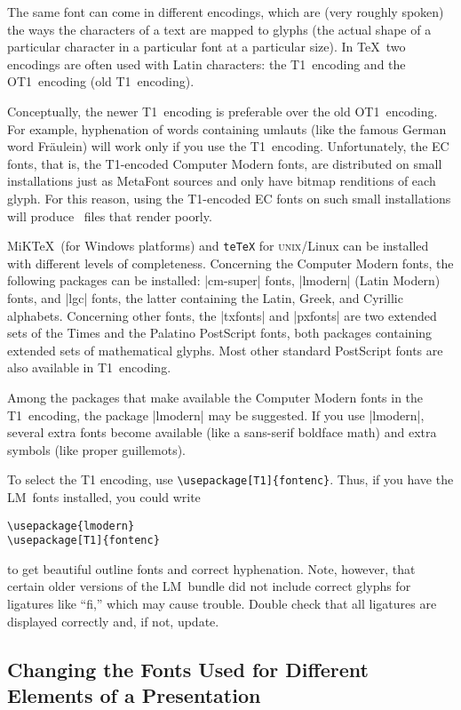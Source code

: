 The same font can come in different encodings, which are (very roughly
spoken) the ways the characters of a text are mapped to glyphs (the
actual shape of a particular character in a particular font at a
particular size). In \TeX\ two encodings are often used with Latin
characters: the T1~encoding and the OT1~encoding (old T1~encoding).

Conceptually, the newer T1~encoding is preferable over the old
OT1~encoding. For example, hyphenation of words containing umlauts
(like the famous German word Fr\"aulein) will work only if you use the
T1~encoding. Unfortunately, the EC fonts, that is, the T1-encoded
Computer Modern fonts, are distributed on small installations just as
MetaFont sources and only have bitmap renditions of each glyph. For
this reason, using the T1-encoded EC fonts on such small installations
will produce \pdf\ files that render poorly.

MiK\TeX\ (for Windows platforms) and \texttt{teTeX} for
\textsc{unix}\slash Linux can be installed with different levels of
completeness. Concerning the Computer Modern fonts, the following
packages can be installed: |cm-super| fonts, |lmodern| (Latin Modern)
fonts, and |lgc| fonts, the latter containing the Latin, Greek, and
Cyrillic alphabets. Concerning other fonts,  the |txfonts| and
|pxfonts| are two extended sets of the Times and the Palatino
PostScript fonts, both packages containing extended sets of
mathematical glyphs. Most other standard PostScript fonts are also
available in T1~encoding.

Among the packages that make available the Computer Modern fonts in the
T1~encoding, the package |lmodern| may be suggested. If you use
|lmodern|, several extra fonts become available (like a sans-serif
boldface math) and extra symbols (like proper guillemots).

To select the T1 encoding, use \verb|\usepackage[T1]{fontenc}|. Thus, if you
have the LM~fonts installed, you could write
\begin{verbatim}
\usepackage{lmodern}
\usepackage[T1]{fontenc}
\end{verbatim}
to get beautiful outline fonts and correct hyphenation. Note, however, that
certain older versions of the LM~bundle did not include correct glyphs
for ligatures like ``fi,'' which may cause trouble. Double check
that all ligatures are displayed correctly and, if not, update.




\subsection{Changing the Fonts Used for Different Elements of a Presentation}

